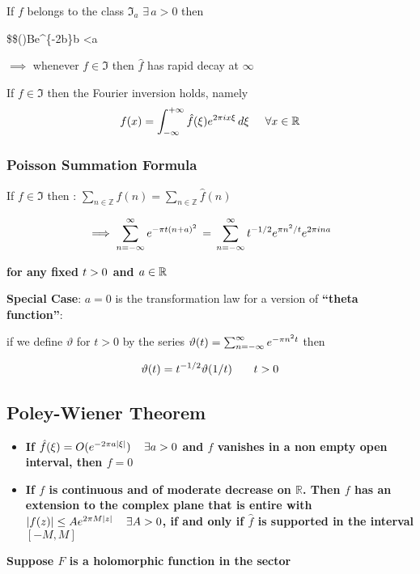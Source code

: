 \documentclass[11pt]{article}
\begin{document}
If \(f\) belongs to the class \(\Im_{a}\,\,\exists\, a>0\) then

\$\$\textbar{}(\xi)\textbar{}\le Be\^{}\{-2\pi b\textbar{}\xi\textbar\}\quad {}\le b
\textless a

\(\implies\) whenever \(f\in\Im\) then \(\hat{f}\) has rapid decay at
\(\infty\)

If \(f\in\Im\) then the Fourier inversion holds, namely
\[\Large f(x)=\int_{-\infty}^{+\infty} \hat{f}(\xi)e^{2\pi i x\xi}\,d\xi\quad\forall x\in\mathbb{R}\]

\subsubsection{Poisson Summation
Formula}\label{poisson-summation-formula}

If \(f\in\Im\) then :
\(\sum_{n\in\mathbb{Z}}f(n)=\sum_{n\in\mathbb{Z}}\hat{f}(n)\)

\[\Huge\implies \sum_{n=-\infty}^{\infty}e^{-\pi t(n+a)^{2}}\,=\,\sum_{n=-\infty}^{\infty}t^{-1/2}e^{\pi n^{2}/t}e^{2\pi ina}\]

\textbf{for any fixed \(\large t>0\) and \(\large a\in\mathbb{R}\)}

\textbf{Special Case}: \(a=0\) is the transformation law for a version
of \textbf{``theta function''}:

if we define \(\vartheta\) for \(t>0\) by the series
\(\large\vartheta(t)=\sum_{n=-\infty}^{\infty} e^{-\pi n^{2}t}\) then

\[\huge \vartheta(t)=t^{-1/2}\vartheta(1/t)\quad t>0\]

    \subsection{Poley-Wiener Theorem}\label{poley-wiener-theorem}

\begin{itemize}
\item
  \textbf{If \(\large\hat{f}(\xi)=O(e^{-2\pi a|\xi|})\quad\exists a>0\)
  and \(f\) vanishes in a non empty open interval, then \(f=0\)}
\item
  \textbf{If \(f\) is continuous and of moderate decrease on
  \(\mathbb{R}\). Then \(f\) has an extension to the complex plane that
  is entire with \(\large|f(z)|\le Ae^{2\pi M |z|}\quad\exists A>0\), if
  and only if \(\hat{f}\) is supported in the interval \([-M, M]\)}
\end{itemize}

\textbf{Suppose \(F\) is a holomorphic function in the sector}
\end{document}
